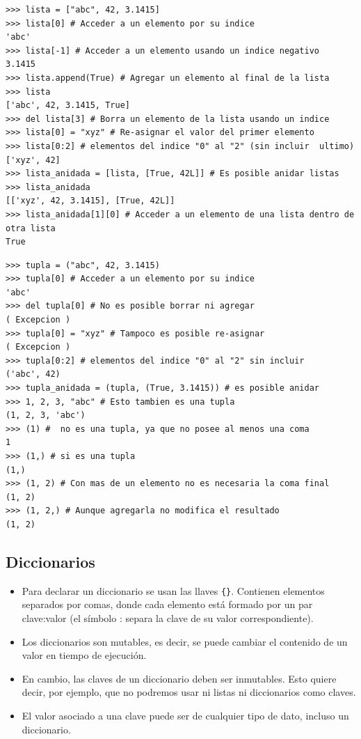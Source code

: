 \begin{lstlisting}
>>> lista = ["abc", 42, 3.1415]
>>> lista[0] # Acceder a un elemento por su indice
'abc'
>>> lista[-1] # Acceder a un elemento usando un indice negativo
3.1415
>>> lista.append(True) # Agregar un elemento al final de la lista
>>> lista
['abc', 42, 3.1415, True]
>>> del lista[3] # Borra un elemento de la lista usando un indice
>>> lista[0] = "xyz" # Re-asignar el valor del primer elemento
>>> lista[0:2] # elementos del indice "0" al "2" (sin incluir  ultimo)
['xyz', 42]
>>> lista_anidada = [lista, [True, 42L]] # Es posible anidar listas
>>> lista_anidada
[['xyz', 42, 3.1415], [True, 42L]]
>>> lista_anidada[1][0] # Acceder a un elemento de una lista dentro de otra lista
True
\end{lstlisting}

\begin{lstlisting}
>>> tupla = ("abc", 42, 3.1415)
>>> tupla[0] # Acceder a un elemento por su indice
'abc'
>>> del tupla[0] # No es posible borrar ni agregar
( Excepcion )
>>> tupla[0] = "xyz" # Tampoco es posible re-asignar
( Excepcion )
>>> tupla[0:2] # elementos del indice "0" al "2" sin incluir
('abc', 42)
>>> tupla_anidada = (tupla, (True, 3.1415)) # es posible anidar
>>> 1, 2, 3, "abc" # Esto tambien es una tupla
(1, 2, 3, 'abc')
>>> (1) #  no es una tupla, ya que no posee al menos una coma
1
>>> (1,) # si es una tupla
(1,)
>>> (1, 2) # Con mas de un elemento no es necesaria la coma final
(1, 2)
>>> (1, 2,) # Aunque agregarla no modifica el resultado
(1, 2)
\end{lstlisting}

\subsection{Diccionarios}
\begin{itemize}
\item    Para declarar un diccionario se usan las llaves \verb~{}~. Contienen elementos separados por comas, donde cada elemento está formado por un par clave:valor (el símbolo : separa la clave de su valor correspondiente).
 \item   Los diccionarios son mutables, es decir, se puede cambiar el contenido de un valor en tiempo de ejecución.
\item    En cambio, las claves de un diccionario deben ser inmutables. Esto quiere decir, por ejemplo, que no podremos usar ni listas ni diccionarios como claves.
\item    El valor asociado a una clave puede ser de cualquier tipo de dato, incluso un diccionario.

\end{itemize}






